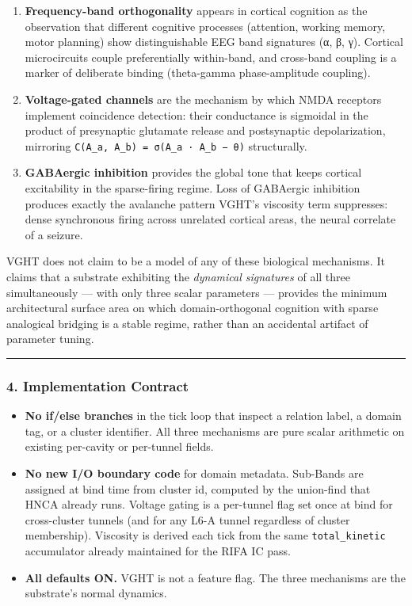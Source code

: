 \documentclass[
  11pt,
  a4paper,
]{article}
\providecommand{\tightlist}{%
  \setlength{\itemsep}{0pt}\setlength{\parskip}{0pt}}
\begin{document}
\begin{enumerate}
\def\labelenumi{\arabic{enumi}.}
\tightlist
\item
  \textbf{Frequency-band orthogonality} appears in cortical cognition as
  the observation that different cognitive processes (attention, working
  memory, motor planning) show distinguishable EEG band signatures (α,
  β, γ). Cortical microcircuits couple preferentially within-band, and
  cross-band coupling is a marker of deliberate binding (theta-gamma
  phase-amplitude coupling).
\item
  \textbf{Voltage-gated channels} are the mechanism by which NMDA
  receptors implement coincidence detection: their conductance is
  sigmoidal in the product of presynaptic glutamate release and
  postsynaptic depolarization, mirroring
  \texttt{C(A\_a,\ A\_b)\ =\ σ(A\_a\ ·\ A\_b\ −\ θ)} structurally.
\item
  \textbf{GABAergic inhibition} provides the global tone that keeps
  cortical excitability in the sparse-firing regime. Loss of GABAergic
  inhibition produces exactly the avalanche pattern VGHT's viscosity
  term suppresses: dense synchronous firing across unrelated cortical
  areas, the neural correlate of a seizure.
\end{enumerate}

VGHT does not claim to be a model of any of these biological mechanisms.
It claims that a substrate exhibiting the \emph{dynamical signatures} of
all three simultaneously --- with only three scalar parameters ---
provides the minimum architectural surface area on which
domain-orthogonal cognition with sparse analogical bridging is a stable
regime, rather than an accidental artifact of parameter tuning.

\begin{center}\rule{0.5\linewidth}{0.5pt}\end{center}

\subsubsection{4. Implementation
Contract}\label{implementation-contract}

\begin{itemize}
\tightlist
\item
  \textbf{No if/else branches} in the tick loop that inspect a relation
  label, a domain tag, or a cluster identifier. All three mechanisms are
  pure scalar arithmetic on existing per-cavity or per-tunnel fields.
\item
  \textbf{No new I/O boundary code} for domain metadata. Sub-Bands are
  assigned at bind time from cluster id, computed by the union-find that
  HNCA already runs. Voltage gating is a per-tunnel flag set once at
  bind for cross-cluster tunnels (and for any L6-A tunnel regardless of
  cluster membership). Viscosity is derived each tick from the same
  \texttt{total\_kinetic} accumulator already maintained for the RIFA IC
  pass.
\item
  \textbf{All defaults ON.} VGHT is not a feature flag. The three
  mechanisms are the substrate's normal dynamics.
\end{itemize}
\end{document}
